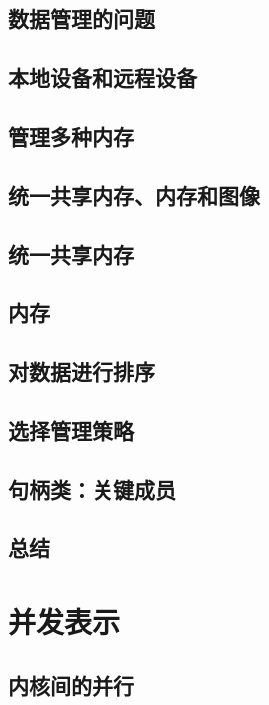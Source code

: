 \documentclass[11pt,a4paper,UTF8]{ctexart}
\begin{document}
		\subsection{数据管理的问题}
		
		\subsection{本地设备和远程设备}
		
		\subsection{管理多种内存}
		
		\subsection{统一共享内存、内存和图像}
		
		\subsection{统一共享内存}
		
		\subsection{内存}
		
		\subsection{对数据进行排序}
		
		\subsection{选择管理策略}
		
		\subsection{句柄类：关键成员}
		
		\subsection{总结}
		
	\section{并发表示}
	
		\subsection{内核间的并行}
		
\end{document}

